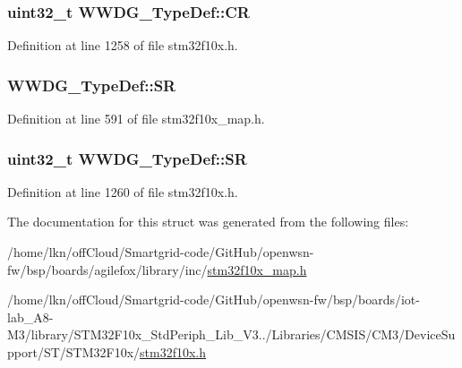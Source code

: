 \subsubsection[{\texorpdfstring{CR}{CR}}]{ {\bf uint32\+\_\+t} W\+W\+D\+G\+\_\+\+Type\+Def\+::\+CR}\hypertarget{struct_w_w_d_g___type_def_a4caf530d45f7428c9700d9c0057135f8}{}\label{struct_w_w_d_g___type_def_a4caf530d45f7428c9700d9c0057135f8}


Definition at line 1258 of file stm32f10x.\+h.

\subsubsection[{\texorpdfstring{SR}{SR}}]{ W\+W\+D\+G\+\_\+\+Type\+Def\+::\+SR}\hypertarget{struct_w_w_d_g___type_def_a5f583619878933ed9cce88813e203696}{}\label{struct_w_w_d_g___type_def_a5f583619878933ed9cce88813e203696}


Definition at line 591 of file stm32f10x\+\_\+map.\+h.

\subsubsection[{\texorpdfstring{SR}{SR}}]{ {\bf uint32\+\_\+t} W\+W\+D\+G\+\_\+\+Type\+Def\+::\+SR}\hypertarget{struct_w_w_d_g___type_def_a15655cda4854cc794db1f27b3c0bba38}{}\label{struct_w_w_d_g___type_def_a15655cda4854cc794db1f27b3c0bba38}


Definition at line 1260 of file stm32f10x.\+h.



The documentation for this struct was generated from the following files\+:\begin{DoxyCompactItemize}
\item 
/home/lkn/off\+Cloud/\+Smartgrid-\/code/\+Git\+Hub/openwsn-\/fw/bsp/boards/agilefox/library/inc/\hyperlink{agilefox_2library_2inc_2stm32f10x__map_8h}{stm32f10x\+\_\+map.\+h}\item 
/home/lkn/off\+Cloud/\+Smartgrid-\/code/\+Git\+Hub/openwsn-\/fw/bsp/boards/iot-\/lab\+\_\+\+A8-\/\+M3/library/\+S\+T\+M32\+F10x\+\_\+\+Std\+Periph\+\_\+\+Lib\+\_\+\+V3../\+Libraries/\+C\+M\+S\+I\+S/\+C\+M3/\+Device\+Support/\+S\+T/\+S\+T\+M32\+F10x/\hyperlink{iot-lab___a8-_m3_2library_2_s_t_m32_f10x___std_periph___lib___v3_85_80_2_libraries_2_c_m_s_i_s_26497265545392eb5694b064ae15018db}{stm32f10x.\+h}\end{DoxyCompactItemize}
